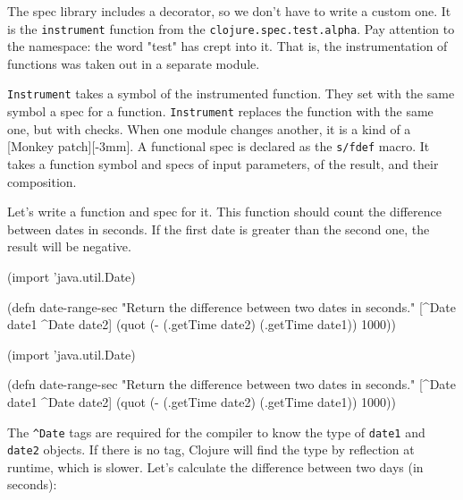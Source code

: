 
The spec library includes a decorator, so we don't have to write a custom one. It is the \verb|instrument| function from the \verb|clojure.spec.test.alpha|. Pay attention to the namespace: the word "test" has crept into it. That is, the instrumentation of functions was taken out in a separate module.


\verb|Instrument| takes a symbol of the instrumented function. They set with the same symbol a spec for a function. \verb|Instrument| replaces the function with the same one, but with checks. When one module changes another, it is a kind of a [Monkey patch][-3mm]. A functional spec is declared as the \verb|s/fdef| macro. It takes a function symbol and specs of input parameters, of the result, and their composition.


Let's write a function and spec for it. This function should count the difference between dates in seconds. If the first date is greater than the second one, the result will be negative.

\ifx\DEVICETYPE\MOBILE

\begin{english}
  \begin{clojure}
(import 'java.util.Date)

(defn date-range-sec
  "Return the difference
           between two dates in seconds."
  [^Date date1 ^Date date2]
  (quot (- (.getTime date2)
           (.getTime date1))
        1000))
  \end{clojure}
\end{english}

\else

\begin{english}
  \begin{clojure}
(import 'java.util.Date)

(defn date-range-sec
  "Return the difference between two dates in seconds."
  [^Date date1 ^Date date2]
  (quot (- (.getTime date2)
           (.getTime date1))
        1000))
  \end{clojure}
\end{english}

\fi

The \verb|^Date| tags are required for the compiler to know the type of \verb|date1| and \verb|date2| objects. If there is no tag, Clojure will find the type by reflection at runtime, which is slower. Let's calculate the difference between two days (in seconds):

